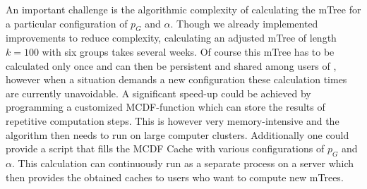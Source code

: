 %
An important challenge is the algorithmic complexity of calculating the mTree for a particular configuration of $p_G$ and $\alpha$.
%
Though we already implemented improvements to reduce complexity, calculating an adjusted mTree of length $k=100$ with six groups takes several weeks.
%
Of course this mTree has to be calculated only once and can then be persistent and shared among users of \algoFAIR, however when a situation demands a new configuration these calculation times are currently unavoidable.
%
A significant speed-up could be achieved by programming a customized MCDF-function which can store the results of repetitive computation steps.
%
This is however very memory-intensive and the algorithm then needs to run on large computer clusters.
%
Additionally one could provide a script that fills the MCDF Cache with various configurations of $p_G$ and $\alpha$.
%
This calculation can continuously run as a separate process on a server which then provides the obtained caches to users who want to compute new mTrees.

